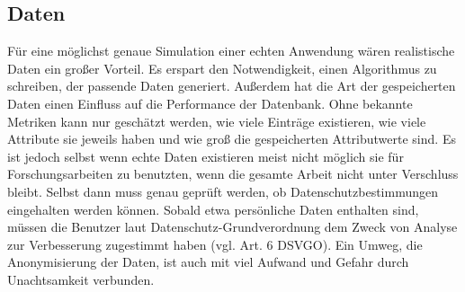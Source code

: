 
\subsection{Daten}

Für eine möglichst genaue Simulation einer echten Anwendung wären realistische Daten ein großer Vorteil. Es erspart den Notwendigkeit, einen Algorithmus zu schreiben, der passende Daten generiert. Außerdem hat die Art der gespeicherten Daten einen Einfluss auf die Performance der Datenbank. Ohne bekannte Metriken kann nur geschätzt werden, wie viele Einträge existieren, wie viele Attribute sie jeweils haben und wie groß die gespeicherten Attributwerte sind. Es ist jedoch selbst wenn echte Daten existieren meist nicht möglich sie für Forschungsarbeiten zu benutzten, wenn die gesamte Arbeit nicht unter Verschluss bleibt. Selbst dann muss genau geprüft werden, ob Datenschutzbestimmungen eingehalten werden können. Sobald etwa persönliche Daten enthalten sind, müssen die Benutzer laut Datenschutz-Grundverordnung dem Zweck von Analyse zur Verbesserung zugestimmt haben (vgl. Art. 6 DSVGO). Ein Umweg, die Anonymisierung der Daten, ist auch mit viel Aufwand und Gefahr durch Unachtsamkeit verbunden.

